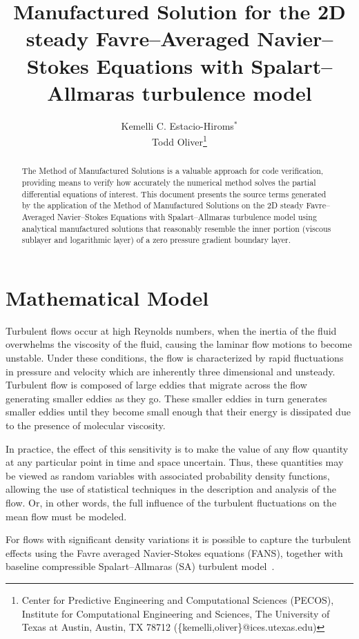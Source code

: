 \documentclass[10pt]{article}
\title{Manufactured Solution for the 2D steady Favre--Averaged Navier--Stokes Equations with Spalart--Allmaras turbulence model}
\author{Kemelli C. Estacio-Hiroms$^*$ \\ Todd Oliver\thanks{Center for Predictive Engineering and Computational Sciences (PECOS), Institute for Computational
    Engineering and Sciences, The University of Texas at Austin,
    Austin, TX 78712 (\{kemelli,oliver\}@ices.utexas.edu)}}
\begin{document}
\maketitle
\tableofcontents

\begin{abstract}
The Method of Manufactured Solutions is a valuable approach for code verification, providing means to verify how accurately the numerical method solves the partial differential equations of interest.
This document presents the source terms generated by the application of the Method of Manufactured Solutions on the 2D steady Favre--Averaged Navier--Stokes Equations with Spalart--Allmaras turbulence model using analytical manufactured solutions that  reasonably resemble the inner portion (viscous sublayer and logarithmic layer) of a zero pressure gradient boundary layer.
\end{abstract}





\section{Mathematical Model}

Turbulent flows occur at high Reynolds numbers, when the inertia of the fluid overwhelms the viscosity of the fluid, causing the laminar flow motions to become unstable. Under these conditions, the flow is characterized by rapid fluctuations in pressure and velocity which are inherently three dimensional and unsteady. Turbulent flow is composed of large eddies that migrate across the flow generating smaller eddies as they go. These smaller eddies in turn generates smaller eddies until they become small enough that their energy is dissipated due to the presence of molecular viscosity.

In practice, the effect of this sensitivity
is to make the value of any flow quantity at any particular point in
time and space uncertain.  Thus, these quantities may be viewed as
random variables with associated probability density functions,
allowing the use of statistical techniques in the description and
analysis of the flow. Or, in other words, the full influence of the turbulent fluctuations on the mean flow must be modeled.

For flows with significant density variations it is possible to  capture the turbulent effects using the Favre averaged Navier-Stokes equations (FANS), together with baseline compressible Spalart--Allmaras (SA) turbulent model~\citep{Oliver2010,Spalart_1994_One_Eqn_Turb_Model}.
\end{document}
